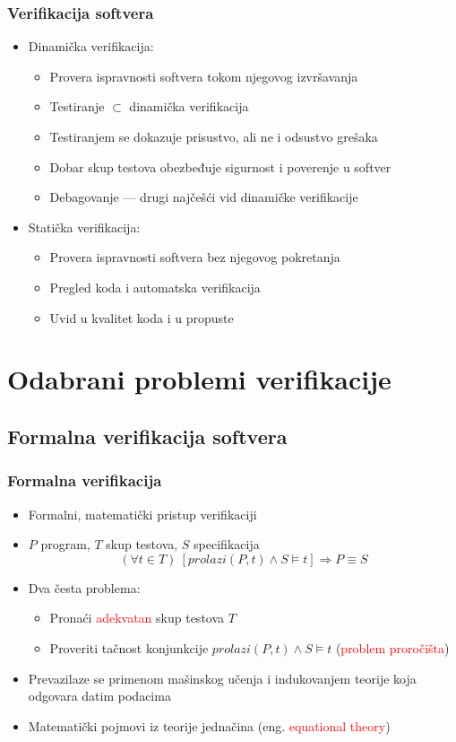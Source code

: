 \documentclass[11pt]{beamer}
\theoremstyle{definition}
\begin{document}
{\begin{frame}
\frametitle{Verifikacija softvera}
\begin{itemize}
\item Dinamička verifikacija:
	\begin{itemize}
		\item Provera ispravnosti softvera tokom njegovog izvršavanja
		\item Testiranje $\subset$ dinamička verifikacija
		\item Testiranjem se dokazuje prisustvo, ali ne i odsustvo grešaka
		\item Dobar skup testova obezbeđuje sigurnost i poverenje u softver
		\item Debagovanje --- drugi najčešći vid dinamičke verifikacije
	\end{itemize}
\item Statička verifikacija:
	\begin{itemize}
		\item Provera ispravnosti softvera bez njegovog pokretanja
		\item Pregled koda i automatska verifikacija
		\item Uvid u kvalitet koda i u propuste
	\end{itemize}
\end{itemize}
\end{frame}

\section{Odabrani problemi verifikacije}
\label{sec:naslovN}

\subsection{Formalna verifikacija softvera}
\label{subsec:formalna-verifikacija}
\begin{frame}
\frametitle{Formalna verifikacija}
\begin{itemize}
\item Formalni, matematički pristup verifikaciji
\item $P$ program, $T$ skup testova, $S$ specifikacija
$$(\forall t\in T)\ [prolazi(P,t)\wedge S\models t]\Rightarrow P\equiv S$$
\item Dva česta problema:
	\begin{itemize}
	\item Pronaći \textcolor{red}{adekvatan} skup testova $T$
	\item Proveriti tačnost konjunkcije $prolazi(P,t)\wedge S\models t$ (\textcolor{red}{problem proročišta})
	\end{itemize}
\item Prevazilaze se primenom mašinskog učenja i indukovanjem teorije koja odgovara datim podacima
\item Matematički pojmovi iz teorije jednačina (eng. \textcolor{red}{equational theory})
\end{itemize}
\end{frame}

}
\end{document}
